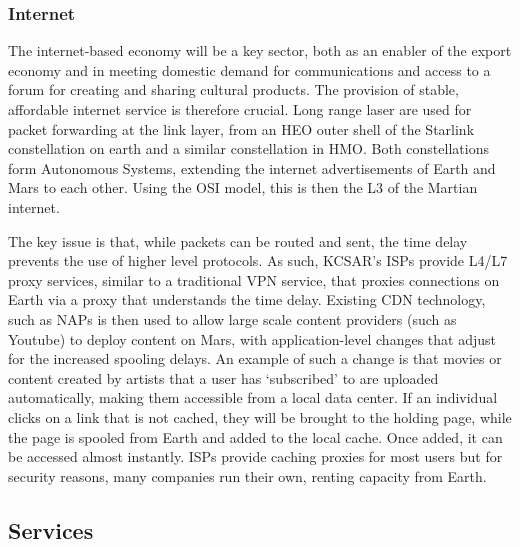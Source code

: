 \documentclass[fleqn,10pt]{Stylesheet} %
\begin{document}
\subsubsection{Internet}
\label{sec:necessities_internet}
The internet-based economy will be a key sector, both as an enabler of the export economy and in meeting domestic demand for communications and access to a forum for creating and sharing cultural products. The provision of stable, affordable internet service is therefore crucial. Long range laser are used for packet forwarding at the link layer, from an HEO outer shell of the Starlink constellation on earth and a similar constellation in HMO. Both constellations form Autonomous Systems, extending the internet advertisements of Earth and Mars to each other. Using the OSI model, this is then the L3 of the Martian internet.

The key issue is that, while packets can be routed and sent, the time delay prevents the use of higher level protocols. As such, KCSAR’s ISPs provide L4/L7 proxy services, similar to a traditional VPN service, that proxies connections on Earth via a proxy that understands the time delay. Existing CDN technology, such as NAPs is then used to allow large scale content providers (such as Youtube) to deploy content on Mars, with application-level changes that adjust for the increased spooling delays. An example of such a change is that movies or content created by artists that a user has ‘subscribed’ to are uploaded automatically, making them accessible from a local data center. If an individual clicks on a link that is not cached, they will be brought to the holding page, while the page is spooled from Earth and added to the local cache. Once added, it can be accessed almost instantly. ISPs provide caching proxies for most users but for security reasons, many companies run their own, renting capacity from Earth.


\subsection{Services}

\end{document}
